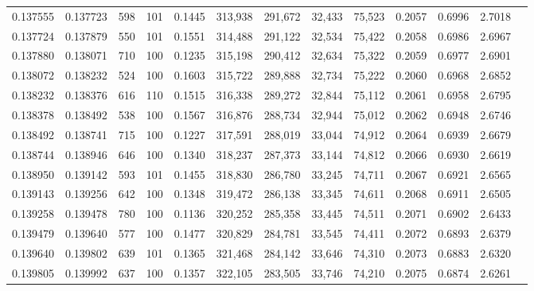 \begin{tabular}{rrrrrrrrrrrrr}
0.137555 & 0.137723 &   598 & 101 &                                     0.1445 & 313,938 & 291,672 &  32,433 &  75,523 & 0.2057 & 0.6996 & 2.7018 \\
0.137724 & 0.137879 &   550 & 101 &                                     0.1551 & 314,488 & 291,122 &  32,534 &  75,422 & 0.2058 & 0.6986 & 2.6967 \\
0.137880 & 0.138071 &   710 & 100 &                                     0.1235 & 315,198 & 290,412 &  32,634 &  75,322 & 0.2059 & 0.6977 & 2.6901 \\
0.138072 & 0.138232 &   524 & 100 &                                     0.1603 & 315,722 & 289,888 &  32,734 &  75,222 & 0.2060 & 0.6968 & 2.6852 \\
0.138232 & 0.138376 &   616 & 110 &                                     0.1515 & 316,338 & 289,272 &  32,844 &  75,112 & 0.2061 & 0.6958 & 2.6795 \\
0.138378 & 0.138492 &   538 & 100 &                                     0.1567 & 316,876 & 288,734 &  32,944 &  75,012 & 0.2062 & 0.6948 & 2.6746 \\
0.138492 & 0.138741 &   715 & 100 &                                     0.1227 & 317,591 & 288,019 &  33,044 &  74,912 & 0.2064 & 0.6939 & 2.6679 \\
0.138744 & 0.138946 &   646 & 100 &                                     0.1340 & 318,237 & 287,373 &  33,144 &  74,812 & 0.2066 & 0.6930 & 2.6619 \\
0.138950 & 0.139142 &   593 & 101 &                                     0.1455 & 318,830 & 286,780 &  33,245 &  74,711 & 0.2067 & 0.6921 & 2.6565 \\
0.139143 & 0.139256 &   642 & 100 &                                     0.1348 & 319,472 & 286,138 &  33,345 &  74,611 & 0.2068 & 0.6911 & 2.6505 \\
0.139258 & 0.139478 &   780 & 100 &                                     0.1136 & 320,252 & 285,358 &  33,445 &  74,511 & 0.2071 & 0.6902 & 2.6433 \\
0.139479 & 0.139640 &   577 & 100 &                                     0.1477 & 320,829 & 284,781 &  33,545 &  74,411 & 0.2072 & 0.6893 & 2.6379 \\
0.139640 & 0.139802 &   639 & 101 &                                     0.1365 & 321,468 & 284,142 &  33,646 &  74,310 & 0.2073 & 0.6883 & 2.6320 \\
0.139805 & 0.139992 &   637 & 100 &                                     0.1357 & 322,105 & 283,505 &  33,746 &  74,210 & 0.2075 & 0.6874 & 2.6261 \\

\end{tabular}
